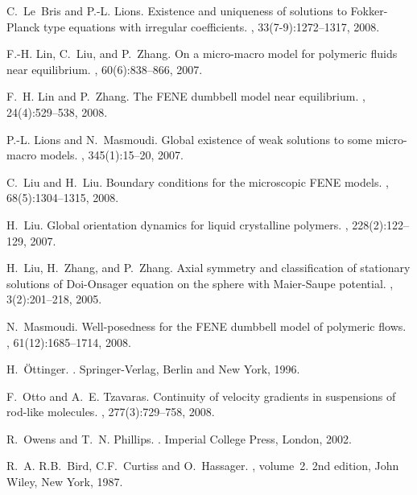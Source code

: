 \documentclass[reqno]{amsart}
\numberwithin{equation}{section}
\theoremstyle{definition}
\theoremstyle{remark}
\begin{document}
\begin{thebibliography}{99}
C.~Le~Bris and P.-L. Lions.
\newblock Existence and uniqueness of solutions to {F}okker-{P}lanck type
  equations with irregular coefficients.
, 33(7-9):1272--1317, 2008.

F.-H. Lin, C.~Liu, and P.~Zhang.
\newblock On a micro-macro model for polymeric fluids near equilibrium.
, 60(6):838--866, 2007.

F.~H. Lin and P.~Zhang.
\newblock The {FENE} dumbbell model near equilibrium.
, 24(4):529--538, 2008.

P.-L. Lions and N.~Masmoudi.
\newblock Global existence of weak solutions to some micro-macro models.
, 345(1):15--20, 2007.

C.~Liu and H.~Liu.
\newblock Boundary conditions for the microscopic {FENE} models.
, 68(5):1304--1315, 2008.

H.~Liu.
\newblock Global orientation dynamics for liquid crystalline polymers.
, 228(2):122--129, 2007.

H.~Liu, H.~Zhang, and P.~Zhang.
\newblock Axial symmetry and classification of stationary solutions of
  {D}oi-{O}nsager equation on the sphere with {M}aier-{S}aupe potential.
, 3(2):201--218, 2005.

N.~Masmoudi.
\newblock Well-posedness for the {FENE} dumbbell model of polymeric flows.
, 61(12):1685--1714, 2008.

H.~{\"O}ttinger.
.
\newblock Springer-Verlag, Berlin and New York, 1996.

F.~Otto and A.~E. Tzavaras.
\newblock Continuity of velocity gradients in suspensions of rod-like
  molecules.
, 277(3):729--758, 2008.

R.~Owens and T.~N. Phillips.
.
\newblock Imperial College Press, London, 2002.

R.~A. R.B.~Bird, C.F.~Curtiss and O.~Hassager.
, volume~2.
\newblock 2nd edition, John Wiley, New York, 1987.


\end{thebibliography}
\end{document}
